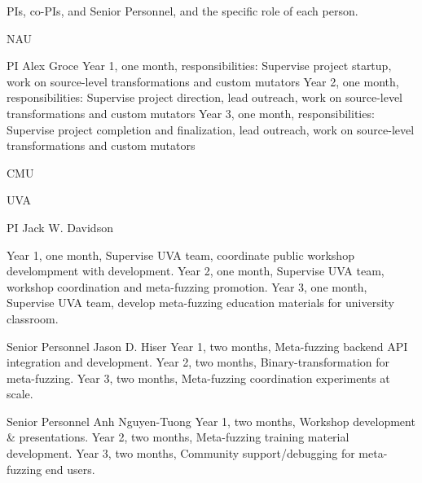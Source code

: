 PIs, co-PIs, and Senior Personnel, and the specific role of each person.


NAU

PI Alex Groce
Year 1, one month, responsibilities:  Supervise project startup, work on source-level transformations and custom mutators
Year 2, one month, responsibilities:  Supervise project direction, lead outreach, work on source-level transformations and custom mutators
Year 3, one month, responsibilities:  Supervise project completion and finalization, lead outreach, work on source-level transformations and custom mutators


CMU


UVA

PI Jack W. Davidson

Year 1,  one month, Supervise UVA team, coordinate public workshop develompment with development.
Year 2,  one month, Supervise UVA team, workshop coordination and meta-fuzzing promotion.
Year 3,  one month, Supervise UVA team, develop meta-fuzzing education materials for university classroom.

Senior Personnel Jason D. Hiser
Year 1,  two months, Meta-fuzzing backend API integration and development.
Year 2,  two months, Binary-transformation for meta-fuzzing.
Year 3,  two months, Meta-fuzzing coordination experiments at scale.

Senior Personnel Anh Nguyen-Tuong
Year 1,  two months, Workshop development \& presentations.
Year 2,  two months, Meta-fuzzing training material development.
Year 3,  two months, Community support/debugging for meta-fuzzing end users.

